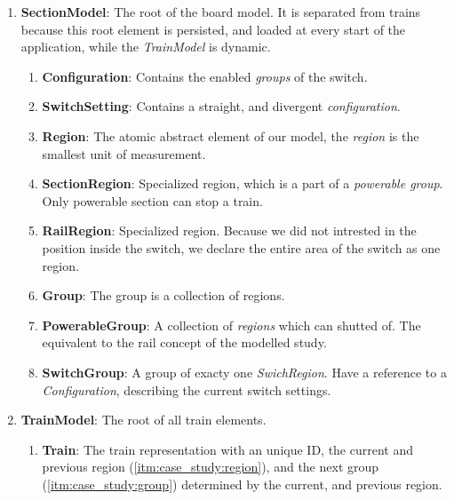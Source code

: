 \begin{enumerate}
	\item \textbf{SectionModel}: The root of the board model. It is separated from trains because this root element is persisted, and loaded at every start of the application, while the \emph{TrainModel} is dynamic.
	\begin{enumerate}
		\item \textbf{Configuration}: Contains the enabled \emph{groups} of the switch.
		\item \textbf{SwitchSetting}: Contains a straight, and divergent \emph{configuration}.
		\item \label{itm:case_study:region} \textbf{Region}: The atomic abstract element of our model, the \emph{region} is the smallest unit of measurement.
		\item \textbf{SectionRegion}: Specialized region, which is a part of a \emph{powerable group}. Only powerable section can stop a train. 
		\item \textbf{RailRegion}: Specialized region. Because we did not intrested in the position inside the switch, we declare the entire area of the switch as one region.
		\item \label{itm:case_study:group} \textbf{Group}: The group is a collection of regions.
		\item \textbf{PowerableGroup}: A collection of \emph{regions} which can shutted of. The equivalent to the rail concept of the modelled study.
		\item \textbf{SwitchGroup}: A group of exacty one \emph{SwichRegion}. Have a reference to a \emph{Configuration}, describing the current switch settings.
	\end{enumerate}
	\item \textbf{TrainModel}: The root of all train elements.
	\begin{enumerate}
		\item \textbf{Train}: The train representation with an unique ID, the current and previous region (\cref{itm:case_study:region}), and the next group (\cref{itm:case_study:group}) determined by the current, and previous region.
	\end{enumerate}
\end{enumerate}

